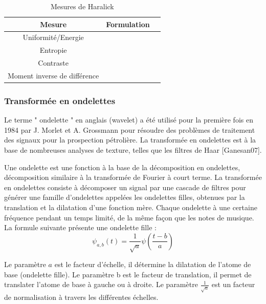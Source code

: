 \begin{table}[H]
	\centering
	\caption{Mesures de Haralick}
	\begin{tabular}{|c|c|c|}
		
		\hline
		\textbf{ Mesure} & \textbf{  Formulation} \\
		\hline
		Uniformité/Energie & \makecell{$E = \sum_{i=0}^{n}\sum_{j=0}^{n} P_{d,\theta}(i, j) $ }    \\
		\hline
		Entropie & \makecell{$En = -\sum_{i=0}^{n}\sum_{j=0}^{n} P_{d,\theta}(i, j) \log_2 (P_{d,\theta}(i, j)) $}    \\
		\hline
		Contraste & \makecell{$ C = \sum_{i=0}^{n}\sum_{j=0}^{n} P_{d,\theta}(i, j) (i-j)^2 $} \\
		\hline
	Moment inverse de différence & \makecell{$ M = \frac{1}{1+(i-j)^2} \sum_{i=0}^{n}\sum_{j=0}^{n} P_{d,\theta}(i, j)  $}\\
	     \hline
	\end{tabular}

\end{table}
 
 
\subsubsection{Transformée en ondelettes}
 Le terme " ondelette " en anglais (wavelet) a été utilisé pour la première fois en 1984 par J. Morlet et A. Grossmann pour résoudre des problèmes de traitement des signaux pour la prospection pétrolière. La transformée en ondelettes est à la base de nombreuses analyses de texture, telles que les filtres de Haar [Ganesan07].
 
 Une ondelette est une fonction à la base de la décomposition en ondelettes, décomposition similaire à la transformée de Fourier à court terme. La transformée en ondelettes consiste à décomposer un signal par une cascade de filtres pour générer une famille d'ondelettes appelées les ondelettes filles, obtenues par la translation et la dilatation d’une fonction mère. Chaque ondelette à une certaine fréquence pendant un temps limité, de la même façon que les notes de musique. La formule suivante présente une ondelette fille :
\begin{equation}
	\psi_{a,b}(t) = \frac{1}{\sqrt{a}}\psi(\frac{t-b}{a})
\end{equation}

Le paramètre $a$ est le facteur d’échelle, il détermine la dilatation de l'atome de base (ondelette fille). Le paramètre b est le facteur de translation, il permet de translater l'atome de base à gauche ou à droite. Le paramètre $ \frac{1}{\sqrt{a}} $ est un facteur de normalisation à travers les différentes échelles.\\

